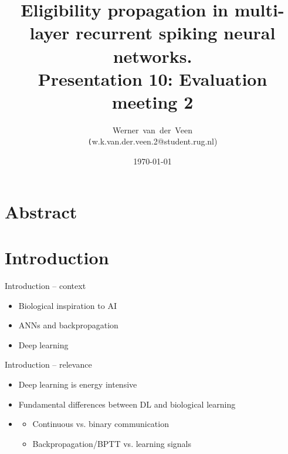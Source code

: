\documentclass[t]{beamer}
\title[Eligibility propagation]{Eligibility propagation in multi-layer recurrent spiking neural networks.\\\vspace{10pt}
\large{Presentation 10: Evaluation meeting 2}}
\author[Werner van der Veen]{Werner~van~der~Veen\\\footnotesize\texttt({w.k.van.der.veen.2@student.rug.nl})}\date{\today}
\begin{document}
\begin{frame}
    \titlepage
\end{frame}



\small

\section{Abstract}

\section{Introduction}
  \begin{frame}{Introduction -- context}
    \begin{itemize}[label=--]
      \item Biological inspiration to AI
      \item ANNs and backpropagation
      \item Deep learning
    \end{itemize}

  \end{frame}

  \begin{frame}{Introduction -- relevance}
    \begin{itemize}[label=--]
      \item Deep learning is energy intensive
      \item Fundamental differences between DL and biological learning
      \item
      \begin{itemize}[label=--]
        \item Continuous vs. binary communication
        \item Backpropagation/BPTT vs. learning signals
      \end{itemize}
    \end{itemize}

  \end{frame}
\end{document}

